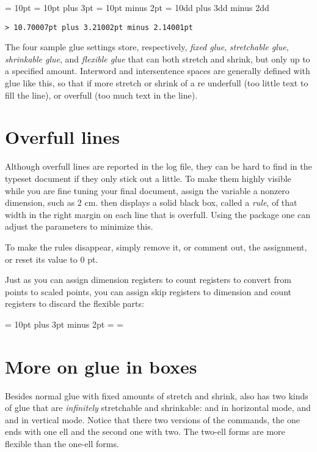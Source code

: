 \begin{teX}
 = 10pt
 = 10pt plus 3pt
 = 10pt minus 2pt
 = 10dd plus 3dd minus 2dd
\the {}
\end{teX}


\texttt{> 10.70007pt plus 3.21002pt minus 2.14001pt}

The four sample glue settings store, respectively, {\em fixed glue}, {\em  stretchable
glue}, {\em shrinkable glue}, and {\em flexible glue}  that can both stretch and shrink,
but only up to a specified amount. Interword and intersentence spaces are
generally defined with glue like this, so that if more stretch or shrink of  a
re underfull (too little text to fill the line), or overfull (too much text in the
line).



\section{Overfull lines}

Although overfull lines are reported in the \tex log file, they can be hard
to find in the typeset document if they only stick out a little. To make
them highly visible while you are fine tuning your final document, assign
the variable  a nonzero dimension, such as 2 cm. \tex then
displays a solid black box, called a \emph{rule}, of that width in the right margin
on each line that is overfull. Using the  package one can adjust the parameters to minimize this.

To make the rules disappear, simply remove it,
or comment out, the assignment, or reset its value to 0 pt. 

Just as you can assign dimension registers to count registers to convert
from points to scaled points, you can assign skip registers to dimension and
count registers to discard the flexible parts:


\begin{teX}
 = 10pt plus 3pt minus 2pt
\the{}
  = 
\the {}
 = 
\the {}
\end{teX}




\section{More on glue in boxes}

Besides normal glue with fixed amounts of stretch and shrink, \tex also has
two kinds of glue that are \emph{infinitely} stretchable and shrinkable:  and
 in horizontal mode, and  and  in vertical mode. Notice that there two versions
of the commands, the one ends with one ell and the second one with two. The
two-ell forms are more flexible than the one-ell forms.

